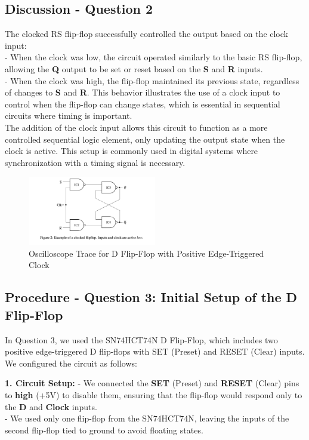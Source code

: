 \documentclass{article}
\begin{document}
    \subsection*{\textbf{Discussion - Question 2}}
    The clocked RS flip-flop successfully controlled the output based on the clock input: \\ 
    - When the clock was low, the circuit operated similarly to the basic RS flip-flop, allowing the \textbf{Q} output to be set or reset based on the \textbf{S} and \textbf{R} inputs.
    \\
    - When the clock was high, the flip-flop maintained its previous state, regardless of changes to \textbf{S} and \textbf{R}. This behavior illustrates the use of a clock input to control when the flip-flop can change states, which is essential in sequential circuits where timing is important.
    \\

    The addition of the clock input allows this circuit to function as a more controlled sequential logic element, only updating the output state when the clock is active. This setup is commonly used in digital systems where synchronization with a timing signal is necessary.

    \begin{figure}[H]
        \centering
        \includegraphics[width=0.5\textwidth]{./img/Lab 11/11_2_1.png}  %
        \caption{Oscilloscope Trace for D Flip-Flop with Positive Edge-Triggered Clock}
        \label{fig:D_FlipFlop_Oscilloscope}
    \end{figure}
    
    \subsection*{\textbf{Procedure - Question 3: Initial Setup of the D Flip-Flop}}
    In Question 3, we used the SN74HCT74N D Flip-Flop, which includes two positive edge-triggered D flip-flops with SET (Preset) and RESET (Clear) inputs. We configured the circuit as follows:

    \textbf{1. Circuit Setup:}
    - We connected the \textbf{SET} (Preset) and \textbf{RESET} (Clear) pins to \textbf{high} (+5V) to disable them, ensuring that the flip-flop would respond only to the \textbf{D} and \textbf{Clock} inputs.
    \\
    - We used only one flip-flop from the SN74HCT74N, leaving the inputs of the second flip-flop tied to ground to avoid floating states.
    \\
\end{document}
